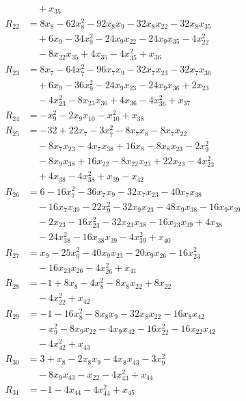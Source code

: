 \begin{align*}
&\quad +x_{35}\\
R_{22} &= 8x_{8} -62x_{8}^{2} -92x_{8}x_{9} -32x_{8}x_{22} -32x_{8}x_{35}\\
&\quad +6x_{9} -34x_{9}^{2} -24x_{9}x_{22} -24x_{9}x_{35} -4x_{22}^{2}\\
&\quad -8x_{22}x_{35} +4x_{35} -4x_{35}^{2} +x_{36}\\
R_{23} &= 8x_{7} -64x_{7}^{2} -96x_{7}x_{9} -32x_{7}x_{23} -32x_{7}x_{36}\\
&\quad +6x_{9} -36x_{9}^{2} -24x_{9}x_{23} -24x_{9}x_{36} +2x_{23}\\
&\quad -4x_{23}^{2} -8x_{23}x_{36} +4x_{36} -4x_{36}^{2} +x_{37}\\
R_{24} &= -x_{9}^{2} -2x_{9}x_{10} -x_{10}^{2} +x_{38}\\
R_{25} &= -32 +22x_{7} -3x_{7}^{2} -8x_{7}x_{8} -8x_{7}x_{22}\\
&\quad -8x_{7}x_{23} -4x_{7}x_{38} +16x_{8} -8x_{8}x_{23} -2x_{9}^{2}\\
&\quad -8x_{9}x_{38} +16x_{22} -8x_{22}x_{23} +22x_{23} -4x_{23}^{2}\\
&\quad +4x_{38} -4x_{38}^{2} +x_{39} -x_{42}\\
R_{26} &= 6 -16x_{7}^{2} -36x_{7}x_{9} -32x_{7}x_{23} -40x_{7}x_{38}\\
&\quad -16x_{7}x_{39} -22x_{9}^{2} -32x_{9}x_{23} -48x_{9}x_{38} -16x_{9}x_{39}\\
&\quad -2x_{23} -16x_{23}^{2} -32x_{23}x_{38} -16x_{23}x_{39} +4x_{38}\\
&\quad -24x_{38}^{2} -16x_{38}x_{39} -4x_{39}^{2} +x_{40}\\
R_{27} &= x_{9} -25x_{9}^{2} -40x_{9}x_{23} -20x_{9}x_{26} -16x_{23}^{2}\\
&\quad -16x_{23}x_{26} -4x_{26}^{2} +x_{41}\\
R_{28} &= -1 +8x_{8} -4x_{8}^{2} -8x_{8}x_{22} +8x_{22}\\
&\quad -4x_{22}^{2} +x_{42}\\
R_{29} &= -1 -16x_{8}^{2} -8x_{8}x_{9} -32x_{8}x_{22} -16x_{8}x_{42}\\
&\quad -x_{9}^{2} -8x_{9}x_{22} -4x_{9}x_{42} -16x_{22}^{2} -16x_{22}x_{42}\\
&\quad -4x_{42}^{2} +x_{43}\\
R_{30} &= 3 +x_{8} -2x_{8}x_{9} -4x_{8}x_{43} -3x_{9}^{2}\\
&\quad -8x_{9}x_{43} -x_{22} -4x_{43}^{2} +x_{44}\\
R_{31} &= -1 -4x_{44} -4x_{44}^{2} +x_{45}\\

\end{align*}
